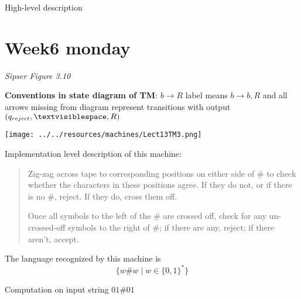 \documentclass[12pt, oneside]{article}
\begin{document}
\vfill

High-level description

\vfill

\newpage
 \vfill
\section*{Week6 monday}



{\it Sipser Figure  3.10}

{\bf Conventions in state diagram of TM}: $b \to R$ label means $b \to b, R$ and
all arrows missing from diagram represent transitions with output $(q_{reject}, \textvisiblespace , R)$

\begin{multicols}{2}
\vspace{-20pt}
\begin{center}
\texttt{[image: ../../resources/machines/Lect13TM3.png]}
\end{center}

Implementation level description of this machine:
\begin{quote}
Zig-zag across tape to corresponding positions on either side of $\#$ to check whether the 
characters in these positions agree. If they do not, or if there is no $\#$, reject. If they 
do, cross them off.

Once all symbols to the left of the $\#$ are crossed off, check for any un-crossed-off symbols 
to the right of $\#$; if there are any, reject; if there aren't, accept.
\end{quote}

The language recognized by this machine is
\[
  \{ w \# w \mid w \in \{0,1\}^* \}
\]

\columnbreak

Computation on  input  string  $01\#01$


\end{multicols}
\end{document}
